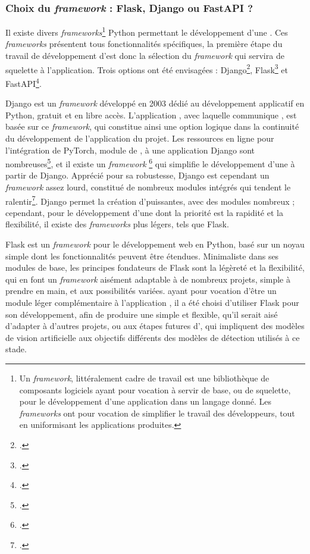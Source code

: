 	\subsubsection{Choix du \textit{framework} : Flask, Django ou FastAPI ?}
	Il existe divers \textit{frameworks}\footnote{Un \textit{framework}, littéralement \og cadre de travail \fg est une bibliothèque de composants logiciels ayant pour vocation à servir de base, ou de squelette, pour le développement d'une application dans un langage donné. Les \textit{frameworks} ont pour vocation de simplifier le travail des développeurs, tout en uniformisant les applications produites.} Python permettant le développement d'une \api. Ces \textit{frameworks} présentent tous fonctionnalités spécifiques, la première étape du travail de développement d'\exapi est donc la sélection du \textit{framework} qui servira de squelette à l'application. Trois options ont été envisagées : Django\footcite{Django}, Flask\footcite{FlaskDocumentation} et FastAPI\footcite{FastAPI}.
	
	Django est un \textit{framework} développé en 2003 dédié au développement applicatif en Python, gratuit et en libre accès. L'application \eida, avec laquelle communique \exapi, est basée sur ce \textit{framework}, qui constitue ainsi une option logique dans la continuité du développement de l'application du projet. Les ressources en ligne pour l'intégration de PyTorch, module de \ml, à une application Django sont nombreuses\footcite{arslanCreateMachineLearning2021}, et il existe un \textit{framework} \rest\footcite{DjangoRESTFramework} qui simplifie le développement d'une \api à partir de Django. Apprécié pour sa robustesse, Django est cependant un \textit{framework} assez lourd, constitué de nombreux modules intégrés qui tendent le ralentir\footcite{sandyChoosingDjangoFlask}. Django permet la création d'\api puissantes, avec des modules nombreux ; cependant, pour le développement d'une \api dont la priorité est la rapidité et la flexibilité, il existe des \textit{frameworks} plus légers, tels que Flask.
	
	Flask est un \textit{framework} pour le développement web en Python, basé sur un noyau simple dont les fonctionnalités peuvent être étendues. Minimaliste dans ses modules de base, les principes fondateurs de Flask sont la légèreté et la flexibilité, qui en font un \textit{framework} aisément adaptable à de nombreux projets, simple à prendre en main, et aux possibilités variées. \exapi ayant pour vocation d'être un module léger complémentaire à l'application \eida, il a été choisi d'utiliser Flask pour son développement, afin de produire une \api simple et flexible, qu'il serait aisé d'adapter à d'autres projets, ou aux étapes futures d'\eida, qui impliquent des modèles de vision artificielle aux objectifs différents des modèles de détection utilisés à ce stade.
	
